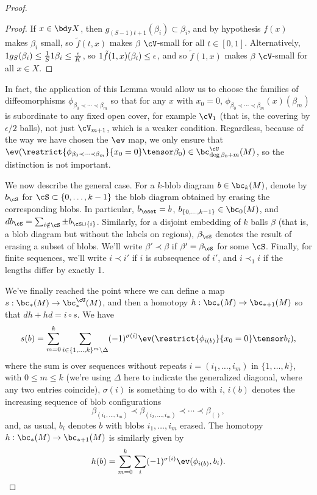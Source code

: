 \begin{proof}
\begin{proof}
If $x \in \bdy X$, then $g_{(S-1)t+1}(\beta_i) \subset \beta_i$, and by hypothesis $f(x)$ makes $\beta_i$ small, so $\tilde{f}(t, x)$ makes $\beta$ $\cV$-small for all $t \in [0,1]$. Alternatively, $1 g_S(\beta_i) \leq \frac{1}{S} 1 \beta_i \leq \frac{\epsilon}{K}$, so $1 \tilde{f}(1,x)(\beta_i) \leq \epsilon$, and so $\tilde{f}(1,x)$ makes $\beta$ $\cV$-small for all $x \in X$.
\end{proof}

In fact, the application of this Lemma would allow us to choose the families of diffeomorphisms $\phi_{\beta_0 \prec \cdots \prec \beta_m}$ so that for any $x$ with $x_0 = 0$, $\phi_{\beta_0 \prec \cdots \prec \beta_m}(x)(\beta_m)$ is subordinate to any fixed open cover, for example $\cV_1$ (that is, the covering by $\epsilon/2$ balls), not just $\cV_{m+1}$, which is a weaker condition. Regardless, because of the way we have chosen the $\ev$ map, we only ensure that $\ev(\restrict{\phi_{\beta_0 \prec \cdots \prec \beta_m}}{x_0 = 0} \tensor \beta_0) \in \bc_{\deg \beta_0 + m}^{\cU}(M)$, so the distinction is not important.

We now describe the general case. For a $k$-blob diagram $b \in \bc_k(M)$, denote by $b_\cS$ for $\cS \subset \{0, \ldots, k-1\}$ the blob diagram obtained by erasing the corresponding blobs. In particular, $b_\eset = b$, $b_{\{0,\ldots,k-1\}} \in \bc_0(M)$, and $d b_\cS = \sum_{i \notin \cS} \pm  b_{\cS \cup \{i\}}$.
Similarly, for a disjoint embedding of $k$ balls $\beta$ (that is, a blob diagram but without the labels on regions), $\beta_\cS$ denotes the result of erasing a subset of blobs. We'll write $\beta' \prec \beta$ if $\beta' = \beta_\cS$ for some $\cS$. Finally, for finite sequences, we'll write $i \prec i'$ if $i$ is subsequence of $i'$, and $i \prec_1 i$ if the lengths differ by exactly 1.



\newcommand{\length}[1]{\operatorname{length}(#1)}

We've finally reached the point where we can define a map $s: \bc_*(M) \to \bc^{\cU}_*(M)$, and then a homotopy $h:\bc_*(M) \to \bc_{*+1}(M)$ so that $dh+hd=i\circ s$.  We have
$$s(b) = \sum_{m=0}^{k} \sum_{i \in \{1, \ldots, k\}^{m} \setminus \Delta} (-1)^{\sigma(i)}  \ev(\restrict{\phi_{i(b)}}{x_0 = 0} \tensor b_i),$$
where the sum is over sequences without repeats $i=(i_1,\ldots,i_m)$ in $\{1,\ldots,k\}$, with $0\leq m \leq k$ (we're using $\Delta$ here to indicate the generalized diagonal, where any two entries coincide), $\sigma(i)$ is something to do with $i$, $i(b)$ denotes the increasing sequence of blob configurations
$$\beta_{(i_1,\ldots,i_m)} \prec \beta_{(i_2,\ldots,i_m)} \prec \cdots \prec \beta_{()},$$
and, as usual, $b_i$ denotes $b$ with blobs $i_1, \ldots, i_m$ erased.
The homotopy $h:\bc_*(M) \to \bc_{*+1}(M)$ is similarly given by
$$h(b) = \sum_{m=0}^{k} \sum_{i} (-1)^{\sigma(i)} \ev(\phi_{i(b)}, b_i).$$


\end{proof}
